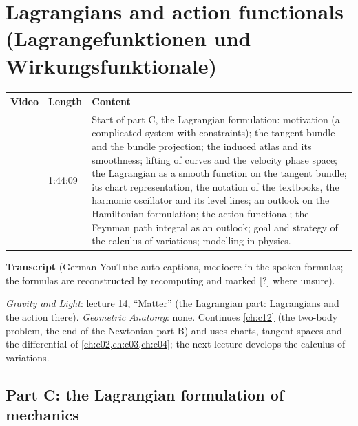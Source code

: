 \chapter{Lagrangians and action functionals (Lagrangefunktionen und Wirkungsfunktionale)}\label{ch:c13}
\begin{paracol}{2}

\begin{sources}
\begin{tabularx}{\linewidth}{@{}l l L@{}}
\toprule
\textbf{Video} & \textbf{Length} & \textbf{Content}\\
\midrule
{} & 1:44:09 & Start of part C, the Lagrangian formulation: motivation (a complicated system with constraints); the tangent bundle and the bundle projection; the induced atlas and its smoothness; lifting of curves and the velocity phase space; the Lagrangian as a smooth function on the tangent bundle; its chart representation, the notation of the textbooks, the harmonic oscillator and its level lines; an outlook on the Hamiltonian formulation; the action functional; the Feynman path integral as an outlook; goal and strategy of the calculus of variations; modelling in physics.\\
\bottomrule
\end{tabularx}

\smallskip
\textbf{Transcript}  (German YouTube auto-captions, mediocre in the spoken formulas; the formulas are reconstructed by recomputing and marked [?] where unsure).
\end{sources}

\begin{reading}
\emph{Gravity and Light}: lecture 14, ``Matter'' (the Lagrangian part: Lagrangians and the action there). \emph{Geometric Anatomy}: none.
Continues \cref{ch:c12} (the two-body problem, the end of the Newtonian part B) and uses charts, tangent spaces and the differential of \cref{ch:c02,ch:c03,ch:c04}; the next lecture develops the calculus of variations.
\end{reading}

\section{Part C: the Lagrangian formulation of mechanics}\label{sec:lag-intro}


\end{paracol}
